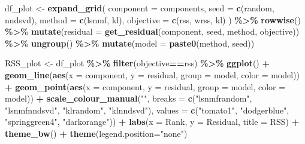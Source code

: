 \documentclass[
]{article}
\newenvironment{Shaded}{\begin{snugshade}}{\end{snugshade}}
\newcommand{\AttributeTok}[1]{\textcolor[rgb]{0.13,0.29,0.53}{#1}}
\newcommand{\FunctionTok}[1]{\textcolor[rgb]{0.13,0.29,0.53}{\textbf{#1}}}
\newcommand{\NormalTok}[1]{#1}
\newcommand{\OtherTok}[1]{\textcolor[rgb]{0.56,0.35,0.01}{#1}}
\newcommand{\SpecialCharTok}[1]{\textcolor[rgb]{0.81,0.36,0.00}{\textbf{#1}}}
\newcommand{\StringTok}[1]{\textcolor[rgb]{0.31,0.60,0.02}{#1}}
\begin{document}
\begin{Shaded}
\begin{Highlighting}[]
\NormalTok{df\_plot }\OtherTok{\textless{}{-}} \FunctionTok{expand\_grid}\NormalTok{(}
  \AttributeTok{component =}\NormalTok{ components,}
  \AttributeTok{seed =} \FunctionTok{c}\NormalTok{(}\StringTok{\textquotesingle{}random\textquotesingle{}}\NormalTok{, }\StringTok{\textquotesingle{}nndsvd\textquotesingle{}}\NormalTok{),}
  \AttributeTok{method =} \FunctionTok{c}\NormalTok{(}\StringTok{\textquotesingle{}lsnmf\textquotesingle{}}\NormalTok{, }\StringTok{\textquotesingle{}kl\textquotesingle{}}\NormalTok{),}
  \AttributeTok{objective =} \FunctionTok{c}\NormalTok{(}\StringTok{\textquotesingle{}rss\textquotesingle{}}\NormalTok{, }\StringTok{\textquotesingle{}wrss\textquotesingle{}}\NormalTok{, }\StringTok{\textquotesingle{}kl\textquotesingle{}}\NormalTok{)}
\NormalTok{) }\SpecialCharTok{\%\textgreater{}\%}
  \FunctionTok{rowwise}\NormalTok{() }\SpecialCharTok{\%\textgreater{}\%}
  \FunctionTok{mutate}\NormalTok{(}\AttributeTok{residual =} \FunctionTok{get\_residual}\NormalTok{(component, seed, method, objective)) }\SpecialCharTok{\%\textgreater{}\%}
  \FunctionTok{ungroup}\NormalTok{() }\SpecialCharTok{\%\textgreater{}\%}
  \FunctionTok{mutate}\NormalTok{(}\AttributeTok{model =} \FunctionTok{paste0}\NormalTok{(method, seed))}

\NormalTok{RSS\_plot }\OtherTok{\textless{}{-}}\NormalTok{ df\_plot }\SpecialCharTok{\%\textgreater{}\%}
  \FunctionTok{filter}\NormalTok{(objective}\SpecialCharTok{==}\StringTok{\textquotesingle{}rss\textquotesingle{}}\NormalTok{) }\SpecialCharTok{\%\textgreater{}\%}
  \FunctionTok{ggplot}\NormalTok{() }\SpecialCharTok{+}
  \FunctionTok{geom\_line}\NormalTok{(}\FunctionTok{aes}\NormalTok{(}\AttributeTok{x =}\NormalTok{ component, }\AttributeTok{y =}\NormalTok{ residual, }\AttributeTok{group =}\NormalTok{ model, }\AttributeTok{color =}\NormalTok{ model)) }\SpecialCharTok{+}
  \FunctionTok{geom\_point}\NormalTok{(}\FunctionTok{aes}\NormalTok{(}\AttributeTok{x =}\NormalTok{ component, }\AttributeTok{y =}\NormalTok{ residual, }\AttributeTok{group =}\NormalTok{ model, }\AttributeTok{color =}\NormalTok{ model)) }\SpecialCharTok{+}
  \FunctionTok{scale\_colour\_manual}\NormalTok{(}\StringTok{""}\NormalTok{, }
                    \AttributeTok{breaks =} \FunctionTok{c}\NormalTok{(}\StringTok{"lsnmfrandom"}\NormalTok{, }\StringTok{"lsnmfnndsvd"}\NormalTok{,}
                               \StringTok{"klrandom"}\NormalTok{, }\StringTok{"klnndsvd"}\NormalTok{),}
                    \AttributeTok{values =} \FunctionTok{c}\NormalTok{(}\StringTok{"tomato1"}\NormalTok{, }\StringTok{"dodgerblue"}\NormalTok{,}
                               \StringTok{"springgreen4"}\NormalTok{, }\StringTok{"darkorange"}\NormalTok{)) }\SpecialCharTok{+}
  \FunctionTok{labs}\NormalTok{(}\AttributeTok{x =} \StringTok{\textquotesingle{}Rank\textquotesingle{}}\NormalTok{, }\AttributeTok{y =} \StringTok{\textquotesingle{}Residual\textquotesingle{}}\NormalTok{, }\AttributeTok{title =} \StringTok{\textquotesingle{}RSS\textquotesingle{}}\NormalTok{) }\SpecialCharTok{+}
  \FunctionTok{theme\_bw}\NormalTok{() }\SpecialCharTok{+}
  \FunctionTok{theme}\NormalTok{(}\AttributeTok{legend.position=}\StringTok{"none"}\NormalTok{)}


\end{Highlighting}
\end{Shaded}
\end{document}
